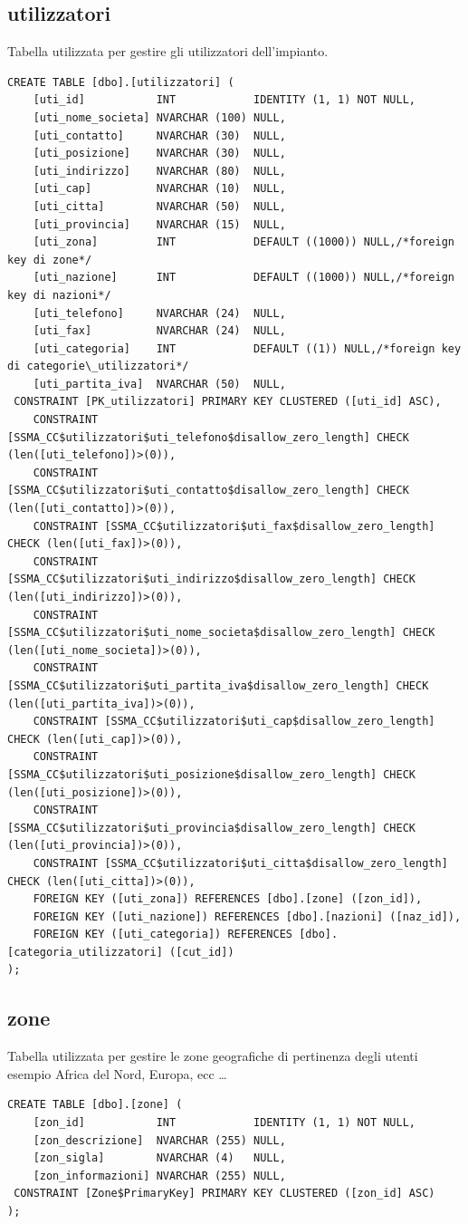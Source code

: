 \documentclass[12pt]{article}
\begin{document}
\subsection{utilizzatori}
Tabella utilizzata per gestire gli utilizzatori dell'impianto.
\begin{lstlisting}
CREATE TABLE [dbo].[utilizzatori] (
    [uti_id]           INT            IDENTITY (1, 1) NOT NULL,
    [uti_nome_societa] NVARCHAR (100) NULL,
    [uti_contatto]     NVARCHAR (30)  NULL,
    [uti_posizione]    NVARCHAR (30)  NULL,
    [uti_indirizzo]    NVARCHAR (80)  NULL,
    [uti_cap]          NVARCHAR (10)  NULL,
    [uti_citta]        NVARCHAR (50)  NULL,
    [uti_provincia]    NVARCHAR (15)  NULL,
    [uti_zona]         INT            DEFAULT ((1000)) NULL,/*foreign key di zone*/
    [uti_nazione]      INT            DEFAULT ((1000)) NULL,/*foreign key di nazioni*/
    [uti_telefono]     NVARCHAR (24)  NULL,
    [uti_fax]          NVARCHAR (24)  NULL,
    [uti_categoria]    INT            DEFAULT ((1)) NULL,/*foreign key di categorie\_utilizzatori*/
    [uti_partita_iva]  NVARCHAR (50)  NULL,
 CONSTRAINT [PK_utilizzatori] PRIMARY KEY CLUSTERED ([uti_id] ASC),
    CONSTRAINT [SSMA_CC$utilizzatori$uti_telefono$disallow_zero_length] CHECK (len([uti_telefono])>(0)),
    CONSTRAINT [SSMA_CC$utilizzatori$uti_contatto$disallow_zero_length] CHECK (len([uti_contatto])>(0)),
    CONSTRAINT [SSMA_CC$utilizzatori$uti_fax$disallow_zero_length] CHECK (len([uti_fax])>(0)),
    CONSTRAINT [SSMA_CC$utilizzatori$uti_indirizzo$disallow_zero_length] CHECK (len([uti_indirizzo])>(0)),
    CONSTRAINT [SSMA_CC$utilizzatori$uti_nome_societa$disallow_zero_length] CHECK (len([uti_nome_societa])>(0)),
    CONSTRAINT [SSMA_CC$utilizzatori$uti_partita_iva$disallow_zero_length] CHECK (len([uti_partita_iva])>(0)),
    CONSTRAINT [SSMA_CC$utilizzatori$uti_cap$disallow_zero_length] CHECK (len([uti_cap])>(0)),
    CONSTRAINT [SSMA_CC$utilizzatori$uti_posizione$disallow_zero_length] CHECK (len([uti_posizione])>(0)),
    CONSTRAINT [SSMA_CC$utilizzatori$uti_provincia$disallow_zero_length] CHECK (len([uti_provincia])>(0)),
    CONSTRAINT [SSMA_CC$utilizzatori$uti_citta$disallow_zero_length] CHECK (len([uti_citta])>(0)),
    FOREIGN KEY ([uti_zona]) REFERENCES [dbo].[zone] ([zon_id]),
    FOREIGN KEY ([uti_nazione]) REFERENCES [dbo].[nazioni] ([naz_id]),
    FOREIGN KEY ([uti_categoria]) REFERENCES [dbo].[categoria_utilizzatori] ([cut_id])
);
\end{lstlisting}

\subsection{zone}
Tabella utilizzata per gestire le zone geografiche di pertinenza degli utenti esempio Africa del Nord, Europa, ecc \dots
\begin{lstlisting}
CREATE TABLE [dbo].[zone] (
    [zon_id]           INT            IDENTITY (1, 1) NOT NULL,
    [zon_descrizione]  NVARCHAR (255) NULL,
    [zon_sigla]        NVARCHAR (4)   NULL,
    [zon_informazioni] NVARCHAR (255) NULL,
 CONSTRAINT [Zone$PrimaryKey] PRIMARY KEY CLUSTERED ([zon_id] ASC)
);
\end{lstlisting}
\end{document}
